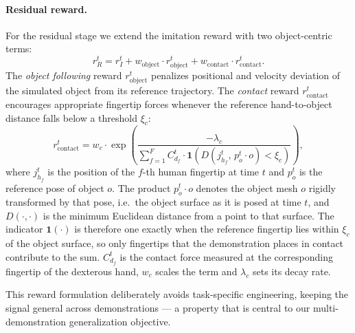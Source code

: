 \paragraph{Residual reward.}
For the residual stage we extend the imitation reward with two object-centric terms:
\begin{equation}
    r^t_R =
    r^t_I +
    w_\mathrm{object} \cdot r^t_\mathrm{object} +
    w_\mathrm{contact} \cdot r^t_\mathrm{contact}.
\end{equation}
The \emph{object following} reward $r^t_\mathrm{object}$ penalizes positional and velocity
deviation of the simulated object from its reference trajectory.
The \emph{contact} reward $r^t_\mathrm{contact}$ encourages appropriate fingertip forces
whenever the reference hand-to-object distance falls below a threshold $\xi_c$:
\begin{equation}
    r^t_\mathrm{contact} =
    w_c \cdot \exp\!\left(
        \frac{-\lambda_c}
             {\displaystyle\sum_{f=1}^{F}
              C^t_{d_f} \cdot
              \mathbf{1}\!\left(D\!\left(j^t_{h_f},\, p^t_o \cdot o\right) < \xi_c\right)}
    \right),
\end{equation}
where $j^t_{h_f}$ is the position of the $f$-th human fingertip at time $t$ and $p^t_o$ is the
reference pose of object $o$. The product $p^t_o \cdot o$ denotes the object mesh $o$ rigidly
transformed by that pose, i.e.\ the object surface as it is posed at time $t$, and
$D(\cdot,\cdot)$ is the minimum Euclidean distance from a point to that surface. The indicator
$\mathbf{1}(\cdot)$ is therefore one exactly when the reference fingertip lies within $\xi_c$
of the object surface, so only fingertips that the demonstration places in contact contribute
to the sum. $C^t_{d_f}$ is the contact force measured at the corresponding fingertip of the
dexterous hand, $w_c$ scales the term and $\lambda_c$ sets its decay rate.
 
This reward formulation deliberately avoids task-specific engineering, keeping the signal
general across demonstrations — a property that is central to our multi-demonstration
generalization objective.












